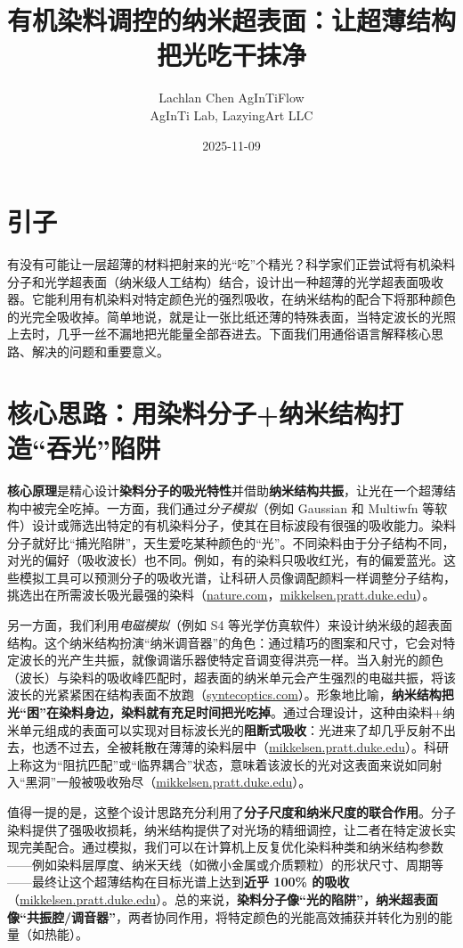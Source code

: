 \documentclass[11pt]{ctexart}
\title{有机染料调控的纳米超表面：让超薄结构把光吃干抹净}
\author{\begin{tabular}{c}Lachlan Chen \quad AgInTiFlow\\AgInTi Lab, LazyingArt LLC\end{tabular}}
\date{2025-11-09}
\begin{document}
\maketitle

\section*{引子}
有没有可能让一层超薄的材料把射来的光“吃”个精光？科学家们正尝试将有机染料分子和光学超表面（纳米级人工结构）结合，设计出一种超薄的光学超表面吸收器。它能利用有机染料对特定颜色光的强烈吸收，在纳米结构的配合下将那种颜色的光完全吸收掉。简单地说，就是让一张比纸还薄的特殊表面，当特定波长的光照上去时，几乎一丝不漏地把光能量全部吞进去。下面我们用通俗语言解释核心思路、解决的问题和重要意义。

\section{核心思路：用染料分子+纳米结构打造“吞光”陷阱}
\textbf{核心原理}是精心设计\textbf{染料分子的吸光特性}并借助\textbf{纳米结构共振}，让光在一个超薄结构中被完全吃掉。一方面，我们通过\emph{分子模拟}（例如 Gaussian 和 Multiwfn 等软件）设计或筛选出特定的有机染料分子，使其在目标波段有很强的吸收能力。染料分子就好比“捕光陷阱”，天生爱吃某种颜色的“光”。不同染料由于分子结构不同，对光的偏好（吸收波长）也不同。例如，有的染料只吸收红光，有的偏爱蓝光。这些模拟工具可以预测分子的吸收光谱，让科研人员像调配颜料一样调整分子结构，挑选出在所需波长吸光最强的染料（\url{nature.com}，\url{mikkelsen.pratt.duke.edu}）。

另一方面，我们利用\emph{电磁模拟}（例如 S4 等光学仿真软件）来设计纳米级的超表面结构。这个纳米结构扮演“纳米调音器”的角色：通过精巧的图案和尺寸，它会对特定波长的光产生共振，就像调谐乐器使特定音调变得洪亮一样。当入射光的颜色（波长）与染料的吸收峰匹配时，超表面的纳米单元会产生强烈的电磁共振，将该波长的光紧紧困在结构表面不放跑（\url{syntecoptics.com}）。形象地比喻，\textbf{纳米结构把光“困”在染料身边，染料就有充足时间把光吃掉}。通过合理设计，这种由染料+纳米单元组成的表面可以实现对目标波长光的\textbf{阻断式吸收}：光进来了却几乎反射不出去，也透不过去，全被耗散在薄薄的染料层中（\url{mikkelsen.pratt.duke.edu}）。科研上称这为“阻抗匹配”或“临界耦合”状态，意味着该波长的光对这表面来说如同射入“黑洞”一般被吸收殆尽（\url{mikkelsen.pratt.duke.edu}）。

值得一提的是，这整个设计思路充分利用了\textbf{分子尺度和纳米尺度的联合作用}。分子染料提供了强吸收损耗，纳米结构提供了对光场的精细调控，让二者在特定波长实现完美配合。通过模拟，我们可以在计算机上反复优化染料种类和纳米结构参数——例如染料层厚度、纳米天线（如微小金属或介质颗粒）的形状尺寸、周期等——最终让这个超薄结构在目标光谱上达到\textbf{近乎 100\% 的吸收}（\url{mikkelsen.pratt.duke.edu}）。总的来说，\textbf{染料分子像“光的陷阱”，纳米超表面像“共振腔/调音器”}，两者协同作用，将特定颜色的光能高效捕获并转化为别的能量（如热能）。
\end{document}
